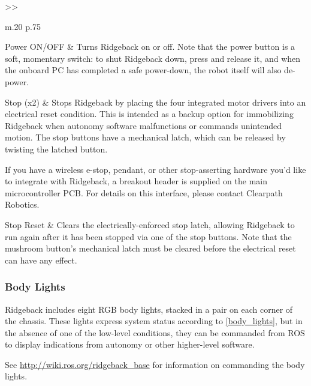 \documentclass[]{clearpath-latex/clearpath-manual}
\begin{document}
\bgroup
\def\arraystretch{1.2}%
\begin{table}[h]
	\centering
	\begin{tabular}{>{}>{\raggedright}m{.20\textwidth} p{.75\textwidth}} \hline

	Power ON/OFF & Turns Ridgeback on or off. Note that the power button is a soft, momentary switch: to shut Ridgeback down, press and release it, and when the onboard PC has completed a safe power-down, the robot itself will also de-power. \\ \hline

	Stop (x2) & Stops Ridgeback by placing the four integrated motor drivers into an electrical reset condition. This is intended as a backup option for immobilizing Ridgeback when autonomy software malfunctions or commands unintended motion. The stop buttons have a mechanical latch, which can be released by twisting the latched button.

	If you have a wireless e-stop, pendant, or other stop-asserting hardware you'd like to integrate with Ridgeback, a breakout header is supplied on the main microcontroller PCB. For details on this interface, please contact Clearpath Robotics. \\ \hline

	Stop Reset & Clears the electrically-enforced stop latch, allowing Ridgeback to run again after it has been stopped via one of the stop buttons. Note that the mushroom button's mechanical latch must be cleared before the electrical reset can have any effect. \\ \hline
	\end{tabular}
\newline
\caption{Ridgeback Rear Buttons}
\label{rearbuttons}
\end{table}
\egroup


\pagebreak[4]
\subsubsection{Body Lights}

Ridgeback includes eight RGB body lights, stacked in a pair on each corner of the chassis. These lights express system status according to \autoref{body_lights}, but in the absence of one of the low-level conditions, they can be commanded from ROS to display indications from autonomy or other higher-level software.

See \url{http://wiki.ros.org/ridgeback_base} for information on commanding the body lights.
\end{document}
